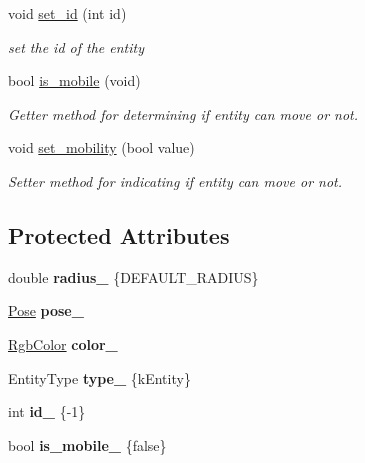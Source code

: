 \begin{DoxyCompactItemize}
void \hyperlink{classArenaEntity_a67f4c0467d32eec76ee6ed033ff9ed2f}{set\+\_\+id} (int id)
\begin{DoxyCompactList}\small\item\em set the id of the entity \end{DoxyCompactList}\item 
bool \hyperlink{classArenaEntity_a9cfea21220c07502abd084afde49ae65}{is\+\_\+mobile} (void)
\begin{DoxyCompactList}\small\item\em Getter method for determining if entity can move or not. \end{DoxyCompactList}\item 
void \hyperlink{classArenaEntity_adb5d3089fec5c28cc989e5834fcdaf6c}{set\+\_\+mobility} (bool value)
\begin{DoxyCompactList}\small\item\em Setter method for indicating if entity can move or not. \end{DoxyCompactList}\end{DoxyCompactItemize}
\subsection*{Protected Attributes}
\begin{DoxyCompactItemize}
\item 
double {\bfseries radius\+\_\+} \{D\+E\+F\+A\+U\+L\+T\+\_\+\+R\+A\+D\+I\+US\}\hypertarget{classArenaEntity_a154b0f51da3e0b1e09596d2f4ab9d59e}{}\label{classArenaEntity_a154b0f51da3e0b1e09596d2f4ab9d59e}

\item 
\hyperlink{structPose}{Pose} {\bfseries pose\+\_\+}\hypertarget{classArenaEntity_a0fadabd1d196a22b8efc20edf9b7af56}{}\label{classArenaEntity_a0fadabd1d196a22b8efc20edf9b7af56}

\item 
\hyperlink{structRgbColor}{Rgb\+Color} {\bfseries color\+\_\+}\hypertarget{classArenaEntity_a41b1633837c9d68d21a364534bb5746b}{}\label{classArenaEntity_a41b1633837c9d68d21a364534bb5746b}

\item 
Entity\+Type {\bfseries type\+\_\+} \{k\+Entity\}\hypertarget{classArenaEntity_a27e8351b3a9953c071464e1f1a9137bc}{}\label{classArenaEntity_a27e8351b3a9953c071464e1f1a9137bc}

\item 
int {\bfseries id\+\_\+} \{-\/1\}\hypertarget{classArenaEntity_a3c62f3b23098fcc2c7c76b01d615bf99}{}\label{classArenaEntity_a3c62f3b23098fcc2c7c76b01d615bf99}

\item 
bool {\bfseries is\+\_\+mobile\+\_\+} \{false\}\hypertarget{classArenaEntity_a606ecb2aec9c7866f86745102ccdeae3}{}\label{classArenaEntity_a606ecb2aec9c7866f86745102ccdeae3}

\end{DoxyCompactItemize}


